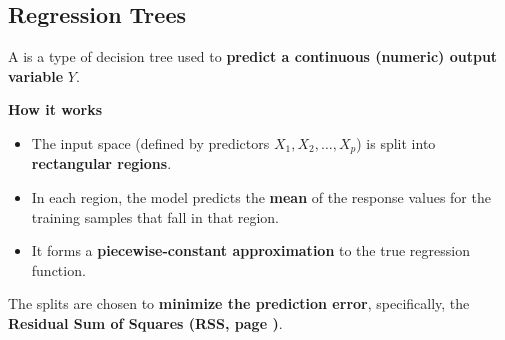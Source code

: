 \subsection{Regression Trees}

A  is a type of decision tree used to \textbf{predict a continuous (numeric) output variable} $Y$.

\highspace
\begin{flushleft}
    \textcolor{Green3}{ \textbf{How it works}}
\end{flushleft}
\begin{itemize}
    \item The input space (defined by predictors $X_1, X_2, \dots, X_p$) is split into \textbf{rectangular regions}.
    \item In each region, the model predicts the \textbf{mean} of the response values for the training samples that fall in that region.
    \item It forms a \textbf{piecewise-constant approximation} to the true regression function.
\end{itemize}
The splits are chosen to \textbf{minimize the prediction error}, specifically, the \textbf{Residual Sum of Squares (RSS, page \pageref{eq: RSS})}.

